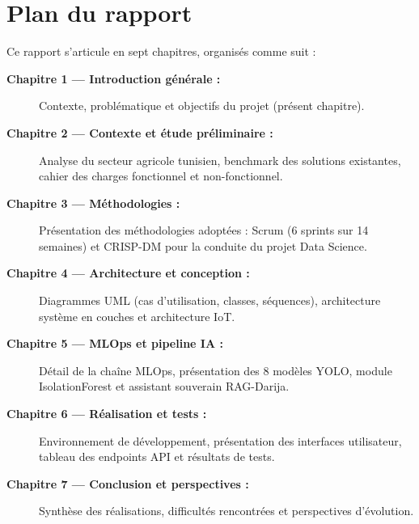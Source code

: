 \section{Plan du rapport}

Ce rapport s'articule en sept chapitres, organisés comme suit :

\begin{description}
  \item[\textbf{Chapitre 1 — Introduction générale :}] Contexte, problématique et
        objectifs du projet (présent chapitre).

  \item[\textbf{Chapitre 2 — Contexte et étude préliminaire :}] Analyse du secteur
        agricole tunisien, benchmark des solutions existantes, cahier des charges
        fonctionnel et non-fonctionnel.

  \item[\textbf{Chapitre 3 — Méthodologies :}] Présentation des méthodologies adoptées :
        Scrum (6 sprints sur 14 semaines) et CRISP-DM pour la conduite du projet Data
        Science.

  \item[\textbf{Chapitre 4 — Architecture et conception :}] Diagrammes UML (cas
        d'utilisation, classes, séquences), architecture système en couches et
        architecture IoT.

  \item[\textbf{Chapitre 5 — MLOps et pipeline IA :}] Détail de la chaîne MLOps,
        présentation des 8 modèles YOLO, module IsolationForest et assistant souverain
        RAG-Darija.

  \item[\textbf{Chapitre 6 — Réalisation et tests :}] Environnement de développement,
        présentation des interfaces utilisateur, tableau des endpoints API et résultats
        de tests.

  \item[\textbf{Chapitre 7 — Conclusion et perspectives :}] Synthèse des réalisations,
        difficultés rencontrées et perspectives d'évolution.
\end{description}
